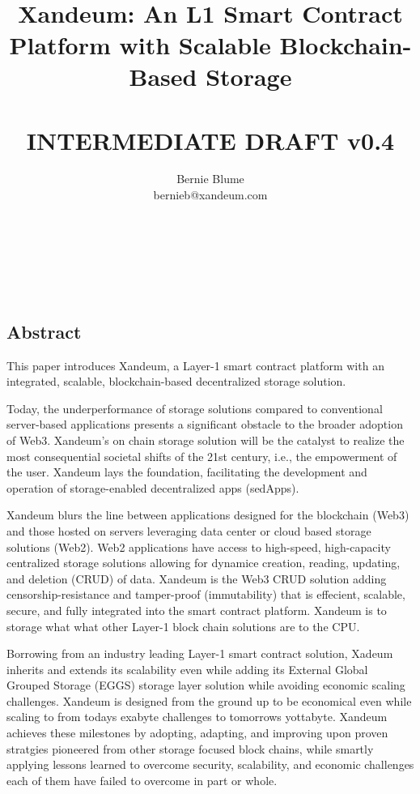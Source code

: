 \documentclass[11pt]{article}   	%
\title{%
\ \\
\ \\
\ \\
Xandeum: An L1 Smart Contract Platform with Scalable Blockchain-Based Storage \\
\ \\
\large INTERMEDIATE DRAFT v0.4}
\author{
{\rm Bernie Blume}\\
bernieb@xandeum.com
}
\begin{document}
\maketitle

\maketitle

\ \\
\ \\
\ \\

\subsection*{Abstract}
This paper introduces Xandeum, a Layer-1 smart contract platform with an integrated, scalable, blockchain-based decentralized storage solution.

Today, the underperformance of storage solutions compared to conventional server-based applications presents a significant obstacle to the broader adoption of Web3. Xandeum's on chain storage solution will be the catalyst to realize the most consequential societal shifts of the 21st century, i.e., the empowerment of the user. Xandeum lays the foundation, facilitating the development and operation of storage-enabled decentralized apps (sedApps).

Xandeum blurs the line between applications designed for the blockchain (Web3) and those hosted on servers leveraging data center or cloud based storage solutions (Web2). Web2 applications have access to high-speed, high-capacity centralized storage solutions allowing for dynamice creation, reading, updating, and deletion (CRUD) of data. Xandeum is the Web3 CRUD solution adding censorship-resistance and tamper-proof (immutability) that is effecient, scalable, secure, and fully integrated into the smart contract platform. Xandeum is to storage what what other Layer-1 block chain solutions are to the CPU.

Borrowing from an industry leading Layer-1 smart contract solution, Xadeum inherits and extends its scalability even while adding its External Global Grouped Storage (EGGS) storage layer solution while avoiding economic scaling challenges. Xandeum is designed from the ground up to be economical even while scaling to from todays exabyte challenges to tomorrows yottabyte. Xandeum achieves these milestones by adopting, adapting, and improving upon proven stratgies pioneered from other storage focused block chains, while smartly applying lessons learned to overcome security, scalability, and economic challenges each of them have failed to overcome in part or whole.
\end{document}
